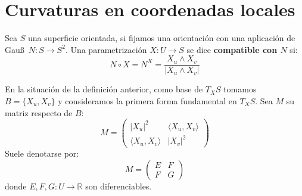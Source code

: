 \section{Curvaturas en coordenadas locales}
\begin{definicion}
    Sea $S$ una superficie orientada, si fijamos una orientación con una aplicación de Gau\ss\ $N:S\to S^2$. Una parametrización $X:U\to S$ se dice \textbf{compatible con $N$} si:
    \begin{equation*}
        N\circ X = N^X = \frac{X_u\land X_v}{|X_u\land X_v|}
    \end{equation*}
\end{definicion}

\noindent
En la situación de la definición anterior, como base de $T_XS$ tomamos $B=\{X_u,X_v\}$ y consideramos la primera forma fundamental en $T_XS$. Sea $M$ su matriz respecto de $B$: 
\begin{equation*}
    M = \left(\begin{array}{cc}
        |X_u|^2 & \langle X_u,X_v \rangle  \\
        \langle X_u,X_v \rangle  & |X_v|^2
    \end{array}\right)
\end{equation*}
Suele denotarse por:
\begin{equation*}
    M = \left(\begin{array}{cc}
        E & F \\
        F & G 
    \end{array}\right)
\end{equation*}
donde $E,F,G:U\to \mathbb{R}$ son diferenciables.\\

